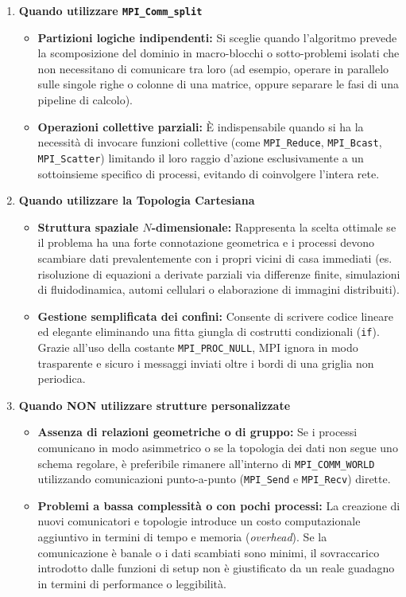 \begin{enumerate}
    \item \textbf{Quando utilizzare \texttt{MPI\_Comm\_split}}
    \begin{itemize}
        \item \textbf{Partizioni logiche indipendenti:} Si sceglie quando l'algoritmo prevede la scomposizione del dominio in macro-blocchi o sotto-problemi isolati che non necessitano di comunicare tra loro (ad esempio, operare in parallelo sulle singole righe o colonne di una matrice, oppure separare le fasi di una pipeline di calcolo).
        \item \textbf{Operazioni collettive parziali:} È indispensabile quando si ha la necessità di invocare funzioni collettive (come \texttt{MPI\_Reduce}, \texttt{MPI\_Bcast}, \texttt{MPI\_Scatter}) limitando il loro raggio d'azione esclusivamente a un sottoinsieme specifico di processi, evitando di coinvolgere l'intera rete.
    \end{itemize}

    \item \textbf{Quando utilizzare la Topologia Cartesiana}
    \begin{itemize}
        \item \textbf{Struttura spaziale $N$-dimensionale:} Rappresenta la scelta ottimale se il problema ha una forte connotazione geometrica e i processi devono scambiare dati prevalentemente con i propri vicini di casa immediati (es. risoluzione di equazioni a derivate parziali via differenze finite, simulazioni di fluidodinamica, automi cellulari o elaborazione di immagini distribuiti).
        \item \textbf{Gestione semplificata dei confini:} Consente di scrivere codice lineare ed elegante eliminando una fitta giungla di costrutti condizionali (\texttt{if}). Grazie all'uso della costante \texttt{MPI\_PROC\_NULL}, MPI ignora in modo trasparente e sicuro i messaggi inviati oltre i bordi di una griglia non periodica.
    \end{itemize}

    \item \textbf{Quando NON utilizzare strutture personalizzate}
    \begin{itemize}
        \item \textbf{Assenza di relazioni geometriche o di gruppo:} Se i processi comunicano in modo asimmetrico o se la topologia dei dati non segue uno schema regolare, è preferibile rimanere all'interno di \texttt{MPI\_COMM\_WORLD} utilizzando comunicazioni punto-a-punto (\texttt{MPI\_Send} e \texttt{MPI\_Recv}) dirette.
        \item \textbf{Problemi a bassa complessità o con pochi processi:} La creazione di nuovi comunicatori e topologie introduce un costo computazionale aggiuntivo in termini di tempo e memoria (\emph{overhead}). Se la comunicazione è banale o i dati scambiati sono minimi, il sovraccarico introdotto dalle funzioni di setup non è giustificato da un reale guadagno in termini di performance o leggibilità.
    \end{itemize}
\end{enumerate}